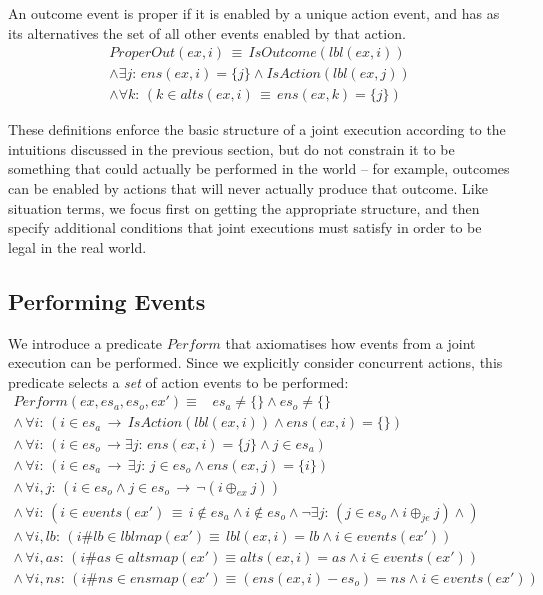 An outcome event is proper if it is enabled by a unique action event,
and has as its alternatives the set of all other events enabled by
that action.\begin{gather*}
ProperOut(ex,i)\,\equiv\, IsOutcome(lbl(ex,i))\\
\wedge\exists j:\, ens(ex,i)=\{j\}\wedge IsAction(lbl(ex,j))\\
\wedge\forall k:\,\left(k\in alts(ex,i)\,\equiv\, ens(ex,k)=\{j\}\right)\end{gather*}


These definitions enforce the basic structure of a joint execution
according to the intuitions discussed in the previous section, but
do not constrain it to be something that could actually be performed
in the world -- for example, outcomes can be enabled by actions that
will never actually produce that outcome. Like situation terms, we
focus first on getting the appropriate structure, and then specify
additional conditions that joint executions must satisfy in order
to be legal in the real world.


\subsection{Performing Events}

We introduce a predicate $Perform$ that axiomatises how events from
a joint execution can be performed. Since we explicitly consider concurrent
actions, this predicate selects a \emph{set} of action events to be
performed: \begin{gather*}
Perform(ex,es_{a},es_{o},ex')\equiv\,\,\,\,\, es_{a}\neq\{\}\wedge es_{o}\neq\{\}\\
\wedge\,\forall i:\,\left(i\in es_{a}\,\rightarrow\, IsAction(lbl(ex,i))\wedge ens(ex,i)=\{\}\right)\\
\wedge\,\forall i:\,\left(i\in es_{o}\,\rightarrow\exists j:\, ens(ex,i)=\{j\}\wedge j\in es_{a}\right)\\
\wedge\,\forall i:\,\left(i\in es_{a}\,\rightarrow\,\exists j:\, j\in es_{o}\wedge ens(ex,j)=\{i\}\right)\\
\wedge\,\forall i,j:\,\left(i\in es_{o}\wedge j\in es_{o}\,\rightarrow\,\neg(i\oplus_{ex}j)\right)\\
\wedge\,\forall i:\,\left(i\in events(ex')\,\equiv\, i\not\in es_{a}\wedge i\not\in es_{o}\wedge\neg\exists j:\,(j\in es_{o}\wedge i\oplus_{je}j)\wedge\right)\\
\wedge\,\forall i,lb:\,\left(i\#lb\in lblmap(ex')\equiv\, lbl(ex,i)=lb\wedge i\in events(ex')\right)\\
\wedge\,\forall i,as:\,\left(i\#as\in altsmap(ex')\equiv alts(ex,i)=as\wedge i\in events(ex')\right)\\
\wedge\,\forall i,ns:\,\left(i\#ns\in ensmap(ex')\equiv(ens(ex,i)-es_{o})=ns\wedge i\in events(ex')\right)\end{gather*}


